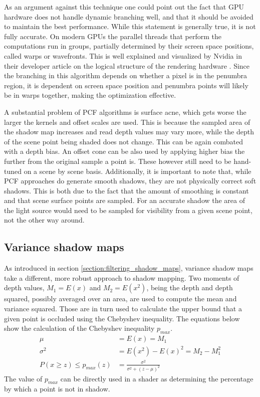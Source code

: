 As an argument against this technique one could point out the fact that GPU hardware does not handle dynamic branching well, and that it should be avoided to maintain the best performance. While this statement is generally true, it is not fully accurate. On modern GPUs the parallel threads that perform the computations run in groups, partially determined by their screen space positions, called warps or wavefronts. This is well explained and visualized by Nvidia in their developer article on the logical structure of the rendering hardware \cite{bib:internet:nvidia_traingle_life}. Since the branching in this algorithm depends on whether a pixel is in the penumbra region, it is dependent on screen space position and penumbra points will likely be in warps together, making the optimization effective.

A substantial problem of PCF algorithms is surface acne, which gets worse the larger the kernels and offset scales are used. This is because the sampled area of the shadow map increases and read depth values may vary more, while the depth of the scene point being shaded does not change. This can be again combated with a depth bias. An offset cone can be also used by applying higher bias the further from the original sample a point is. These however still need to be hand-tuned on a scene by scene basis. Additionally, it is important to note that, while PCF approaches do generate smooth shadows, they are not physically correct soft shadows. This is both due to the fact that the amount of smoothing is constant and that scene surface points are sampled. For an accurate shadow the area of the light source would need to be sampled for visibility from a given scene point, not the other way around.

\subsection{Variance shadow maps}
\label{section:impl_vsm}
As introduced in section \ref{section:filtering_shadow_maps}, variance shadow maps take a different, more robust approach to shadow mapping. Two moments of depth values, \(M_1 = E(x)\) and \(M_2 = E(x^2)\), being the depth and depth squared, possibly averaged over an area, are used to compute the mean and variance squared. Those are in turn used to calculate the upper bound that a given point is occluded using the Chebyshev inequality. The equations below show the calculation of the Chebyshev inequality \(p_{max}\).
\begin{align}
    \label{eq:Chebyshev}
    \mu &= E(x) = M_1 \\
    \sigma^2 &= E(x^2) - E(x)^2 = M_2 - M_1^2 \\
    P(x \ge z)\le p_{max}(z) &= \frac{\sigma^2}{\sigma^2 + (z-\mu)^2}
\end{align}
The value of \(p_{max}\) can be directly used in a shader as determining the percentage by which a point is not in shadow.


